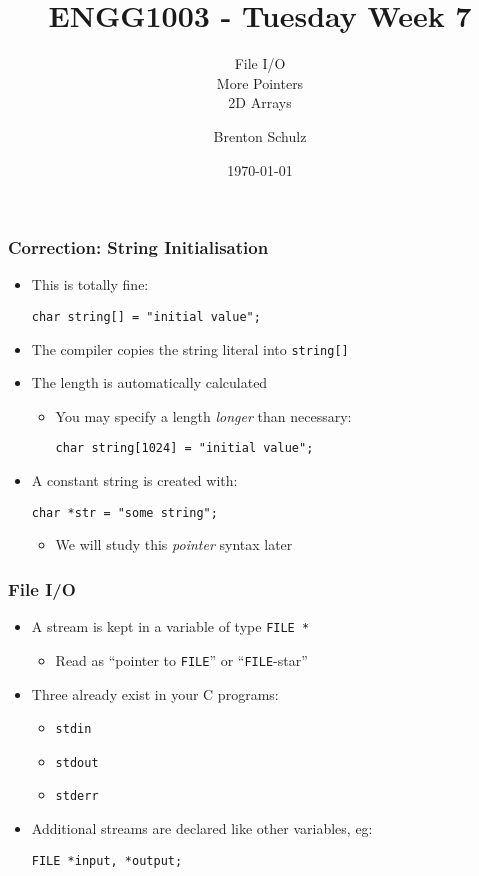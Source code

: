 \documentclass[14pt]{beamer}
\title{ENGG1003 - Tuesday Week 7}
\subtitle{File I/O\\More Pointers\\2D Arrays}
\author{Brenton Schulz}
\institute{University of Newcastle}
\date{\today}
\begin{document}
\titlepage
\begin{frame}[fragile]
\frametitle{Correction: String Initialisation}
\begin{itemize}
\item This is totally fine:
\begin{lstlisting}[style=CStyle]
char string[] = "initial value";
\end{lstlisting}
\item The compiler copies the string literal into \texttt{string[]}
\item The length is automatically calculated
	\begin{itemize}
		\item You may specify a length \textit{longer} than necessary:
\begin{lstlisting}[style=CStyle]
char string[1024] = "initial value";			
\end{lstlisting}
	\end{itemize}
\pause
\item A constant string is created with:
\begin{lstlisting}[style=CStyle]
char *str = "some string";
\end{lstlisting}
	\begin{itemize}
		\item We will study this \textit{pointer} syntax later
	\end{itemize}
\end{itemize}
\end{frame}

\begin{frame}[fragile]
\frametitle{File I/O}
\begin{itemize}
\item A stream is kept in a variable of type \texttt{FILE~*}
	\begin{itemize}
		\item Read as ``pointer to \texttt{FILE}'' or ``\texttt{FILE}-star''
	\end{itemize}
\item Three already exist in your C programs:
	\begin{itemize}
		\item \texttt{stdin}
		\item \texttt{stdout}
		\item \texttt{stderr}
	\end{itemize}
\item Additional streams are declared like other variables, eg:
\begin{lstlisting}[style=CStyle]
FILE *input, *output;
\end{lstlisting}
\end{itemize}
\end{frame}
\end{document}

